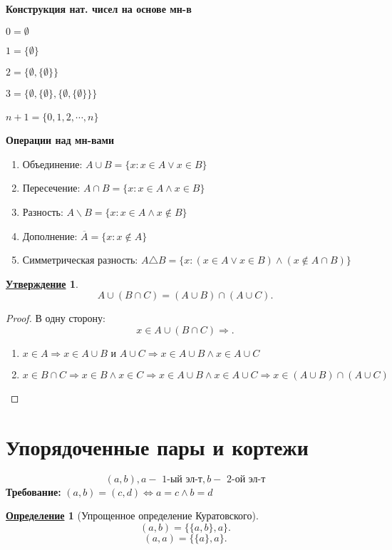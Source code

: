 \documentclass[12pt]{article}
\newtheorem{statement}{\underline{Утверждение}}[section]
\theoremstyle{definition}
\newtheorem{definition}{\underline{Определение}}[section]
\theoremstyle{definition}
\begin{document}
\textbf{Конструкция нат. чисел на основе мн-в} 

$0 = \emptyset$

$1 = \{\emptyset\}$

$2 = \{\emptyset, \{\emptyset\}\}$

$3 = \{\emptyset, \{\emptyset\}, \{\emptyset, \{\emptyset\}\}\}$

$n + 1 = \{0, 1, 2, \cdots, n\}$
~\newline

\textbf{Операции над мн-вами}
\begin{enumerate}
    \item Объединение: $A \cup B = \{ x \colon x \in A \lor x \in B\}$
    \item Пересечение: $A \cap B = \{x \colon x \in A \land x \in B\}$ 
    \item Разность: $A \backslash B = \{x \colon x \in A \land x \not\in B\}$
    \item Дополнение: $\overline{A} = \{x \colon x \not\in A\}$
    \item Симметрическая разность: $A \triangle B = \{x \colon (x \in A \lor x \in B) \land (x \not\in A \cap B)\}$
\end{enumerate}

\begin{statement}
\[
A \cup (B \cap C) = (A \cup B) \cap (A \cup C)
.\] 
\end{statement}
\begin{proof}
    В одну сторону:
\[
x \in A \cup(B \cap C) \Rightarrow 
.\] 
\begin{enumerate}
    \item $x \in A \Rightarrow x \in A \cup B \text{ и } A \cup C \Rightarrow x \in A \cup B \land x \in A \cup C$
    \item $x \in B \cap C \Rightarrow x \in B \land x \in C \Rightarrow x \in A \cup B \land  x \in A \cup C \Rightarrow x \in (A \cup B) \cap (A \cup C)$
\end{enumerate}
\end{proof}

\section{Упорядоченные пары и кортежи}
\[
    (a, b), a - \text{ 1-ый эл-т}, b - \text{ 2-ой эл-т}
\]
\textbf{Требование: } $(a, b) = (c, d) \iff a = c \land b = d$

\begin{definition}[Упрощенное определение Куратовского]
    \[
        (a, b) = \{\{a, b\}, a\}
.\] 
        \[
            (a, a) = \{\{a\}, a\}
        .\] 


\end{definition}
\end{document}
